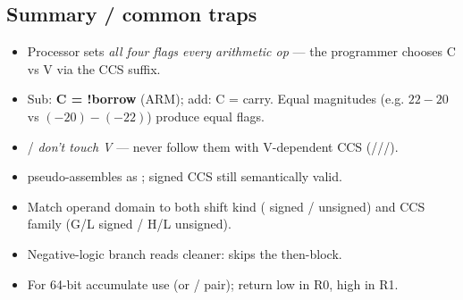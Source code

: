 \subsection{Summary / common traps}
\begin{itemize}
  \item Processor sets \emph{all four flags every arithmetic op} --- the programmer chooses C vs V via the CCS suffix.
  \item Sub: \textbf{C = !borrow} (ARM); add: C = carry. Equal magnitudes (e.g. $22{-}20$ vs $({-}20){-}({-}22)$) produce equal flags.
  \item {}/ \emph{don't touch V} --- never follow them with V-dependent CCS (///).
  \item {} pseudo-assembles as ; signed CCS still semantically valid.
  \item Match operand domain to both shift kind ( signed /  unsigned) and CCS family (G/L signed / H/L unsigned).
  \item Negative-logic branch reads cleaner:  skips the then-block.
  \item For 64-bit accumulate use  (or / pair); return low in R0, high in R1.
\end{itemize}

